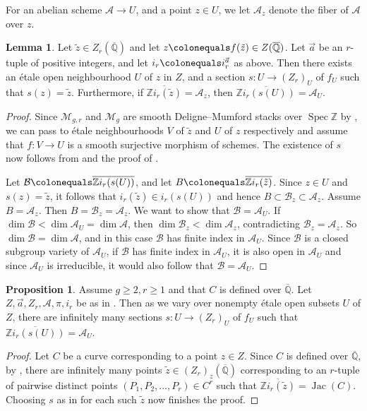 \documentclass[reqno,10pt]{amsart}
\theoremstyle{definition}
\theoremstyle{definition}
\newtheorem{prop}[thm]{Proposition}
\newtheorem{lem}[thm]{Lemma}
\def\Z{{\mathbb Z}}
\def\Qbar{\overline{\mathbb{Q}}}
\DeclareMathOperator{\Spec}{Spec}
\DeclareMathOperator{\Jac}{Jac}
\begin{document}
For an abelian scheme $\mathcal{A} \rightarrow U$, and a point $z \in U$, we let $\mathcal{A}_z$ denote the fiber of $\mathcal{A}$ over $z$. 
\begin{lem}\label{lem:secthroughpt}
Let $\tilde{z} \in Z_r(\Qbar)$ and let $z \colonequals f(\tilde{z}) \in Z(\Qbar)$. Let $\vec{a}$ be an $r$-tuple of positive integers, and let $i_r \colonequals i_r^{\vec{a}}$ as above. Then there exists an \'{e}tale open neighbourhood $U$ of $z$ in $Z$, and a section $s \colon U \rightarrow ({Z_r})_U$ of $f_U$ such that $s(z) = \tilde{z}$. Furthermore, if $\overline{\Z i_r(\tilde{z})} = \mathcal{A}_z$, then $\overline{\Z i_r(s(U))} = \mathcal{A}_U$.
\end{lem}
\begin{proof}
Since $\mathcal{M}_{g,r}$ and $\mathcal{M}_g$ are smooth Deligne--Mumford stacks over $\Spec \Z$ by \cite[Theorem~5.2]{DMstack}, we can pass to \'{e}tale neighbourhoods $V$ of $\tilde{z}$ and $U$ of $z$ respectively and assume that $f \colon V \rightarrow U$ is a smooth surjective morphism of schemes. The existence of $s$ now follows from \cite[Corollaire~17.16.3~(ii)]{EGAIV4} and the proof of \cite[Corollaire~17.16.1]{EGAIV4}.

Let $\mathcal{B} \colonequals \overline{\Z i_r(s(U))}$, and let $B \colonequals \overline{\Z i_r(\tilde{z})}$. Since $z \in U$ and $s(z) = \tilde{z}$, it follows that $i_r(\tilde{z}) \in i_r(s(U))$ and hence $B \subset \mathcal{B}_z \subset \mathcal{A}_z$. Assume $B = \mathcal{A}_z$. Then $B = \mathcal{B}_z =  \mathcal{A}_z$.  We want to show that $\mathcal{B} = \mathcal{A}_U$. If $\dim \mathcal{B} < \dim \mathcal{A}_U = \dim \mathcal{A}$, then $\dim \mathcal{B}_z < \dim \mathcal{A}_z$, contradicting $\mathcal{B}_z = \mathcal{A}_z$. So $\dim \mathcal{B} = \dim \mathcal{A}$, and in this case $\mathcal{B}$ has finite index in $\mathcal{A}_U$. Since $\mathcal{B}$ is a closed subgroup variety of $\mathcal{A}_U$, if $\mathcal{B}$ has finite index in $\mathcal{A}_U$, it is also open in $\mathcal{A}_U$ and since $\mathcal{A}_U$ is irreducible, it would also follow that $\mathcal{B} = \mathcal{A}_U$. 
\end{proof}

\begin{prop}\label{prop:AJgenerates} 
Assume $g \geq 2, r \geq 1$ and that $C$ is defined over $\Qbar$. Let $Z,\vec{a}, Z_r, \mathcal{A}, \pi, i_r$ be as in . Then as we vary over nonempty \'{e}tale open subsets $U$ of $Z$, there are infinitely many sections $s \colon U \rightarrow (Z_r)_U$ of $f_U$ such that
$\overline{\Z i_r(s(U))} = \mathcal{A}_U$.
\end{prop}
\begin{proof}
Let $C$ be a curve corresponding to a point $z \in Z$. Since $C$ is defined over $\Qbar$, by , there are infinitely many points $\tilde{z} \in (Z_r)_z(\Qbar)$ corresponding to an $r$-tuple of pairwise distinct points $(P_1,P_2,\ldots,P_r) \in C^r$ such that $\overline{\Z i_r(\tilde{z})} = \Jac(C)$. Choosing $s$ as in  for each such $\tilde{z}$ now finishes the proof.
\end{proof}
\end{document}
